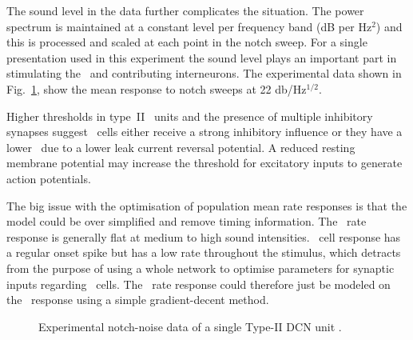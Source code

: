 
The sound level in the \citet{ReissYoung:2005} data further complicates the
situation.  The power spectrum is maintained at a constant level per frequency
band (dB per Hz$^2$) and this is processed and scaled at each point in the notch
sweep.  For a single presentation used in this experiment the sound level plays
an important part in stimulating the \ANFs~and contributing interneurons.  The
experimental data shown in Fig.~\ref{fig:TVReissFig9}, show the mean response to
notch sweeps at 22 db/Hz$^{1/2}$.


Higher thresholds in type~II \DCN~units \citep{SpirouDavisEtAl:1999} and the
presence of multiple inhibitory synapses \citep{Alibardi:2006} suggest \TV~cells
either receive a strong inhibitory influence or they have a lower \RMP~due to a
lower leak current reversal potential. A reduced resting membrane potential may
increase the threshold for excitatory inputs to generate action potentials.



The big issue with the optimisation of population mean rate responses is that
the model could be over simplified and remove timing information.  The \HSR~rate
response is generally flat at medium to high sound intensities. \DS~cell
response has a regular onset spike but has a low rate throughout the stimulus,
which detracts from the purpose of using a whole network to optimise parameters
for synaptic inputs regarding \TV~cells.  The \TV~rate response could therefore
just be modeled on the \LSR~response using a simple gradient-decent
method. 
 


\begin{figure}[htb]
  \centering {}
  \caption[Experimental notch-noise data of a single Type-II DCN unit]{Experimental notch-noise data of a single Type-II DCN unit
    \citep[,~Fig.~9]{ReissYoung:2005}.}
  \label{fig:TVReissFig9}
\end{figure}


